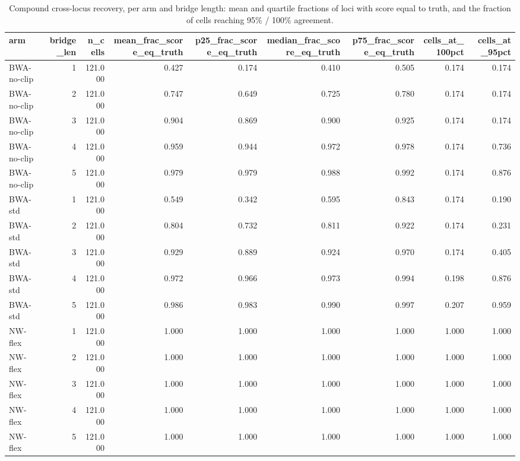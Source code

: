 \begin{table}
\caption{Compound cross-locus recovery, per arm and bridge length: mean and quartile fractions of loci with score equal to truth, and the fraction of cells reaching 95\% / 100\% agreement.}
\label{tab:compound-recovery-by-bridge}
\begin{tabular}{lrrrrrrrr}
\toprule
arm & bridge_len & n_cells & mean_frac_score_eq_truth & p25_frac_score_eq_truth & median_frac_score_eq_truth & p75_frac_score_eq_truth & cells_at_100pct & cells_at_95pct \\
\midrule
BWA-no-clip & 1 & 121.000 & 0.427 & 0.174 & 0.410 & 0.505 & 0.174 & 0.174 \\
BWA-no-clip & 2 & 121.000 & 0.747 & 0.649 & 0.725 & 0.780 & 0.174 & 0.174 \\
BWA-no-clip & 3 & 121.000 & 0.904 & 0.869 & 0.900 & 0.925 & 0.174 & 0.174 \\
BWA-no-clip & 4 & 121.000 & 0.959 & 0.944 & 0.972 & 0.978 & 0.174 & 0.736 \\
BWA-no-clip & 5 & 121.000 & 0.979 & 0.979 & 0.988 & 0.992 & 0.174 & 0.876 \\
BWA-std & 1 & 121.000 & 0.549 & 0.342 & 0.595 & 0.843 & 0.174 & 0.190 \\
BWA-std & 2 & 121.000 & 0.804 & 0.732 & 0.811 & 0.922 & 0.174 & 0.231 \\
BWA-std & 3 & 121.000 & 0.929 & 0.889 & 0.924 & 0.970 & 0.174 & 0.405 \\
BWA-std & 4 & 121.000 & 0.972 & 0.966 & 0.973 & 0.994 & 0.198 & 0.876 \\
BWA-std & 5 & 121.000 & 0.986 & 0.983 & 0.990 & 0.997 & 0.207 & 0.959 \\
NW-flex & 1 & 121.000 & 1.000 & 1.000 & 1.000 & 1.000 & 1.000 & 1.000 \\
NW-flex & 2 & 121.000 & 1.000 & 1.000 & 1.000 & 1.000 & 1.000 & 1.000 \\
NW-flex & 3 & 121.000 & 1.000 & 1.000 & 1.000 & 1.000 & 1.000 & 1.000 \\
NW-flex & 4 & 121.000 & 1.000 & 1.000 & 1.000 & 1.000 & 1.000 & 1.000 \\
NW-flex & 5 & 121.000 & 1.000 & 1.000 & 1.000 & 1.000 & 1.000 & 1.000 \\
\bottomrule
\end{tabular}
\end{table}
